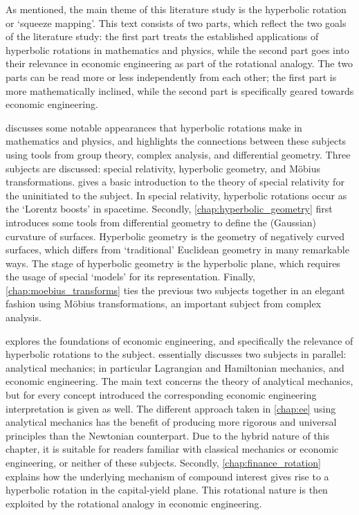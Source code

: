 As mentioned, the main theme of this literature study is the hyperbolic rotation or `squeeze mapping'. This text consists of two parts, which reflect the two goals of the literature study: the first part treats the established applications of hyperbolic rotations in mathematics and physics, while the second part goes into their relevance in economic engineering as part of the rotational analogy. 
The two parts can be read more or less independently from each other; the first part is more mathematically inclined, while the second part is specifically geared towards economic engineering.
\begin{description}
    \item{\textbf{}} discusses some notable appearances that hyperbolic rotations make in mathematics and physics, and highlights the connections between these subjects using tools from group theory, complex analysis, and differential geometry. Three subjects are discussed: special relativity, hyperbolic geometry, and Möbius transformations.  gives a basic introduction to the theory of special relativity for the uninitiated to the subject. In special relativity, hyperbolic rotations occur as the `Lorentz boosts' in spacetime. Secondly, \cref{chap:hyperbolic_geometry} first introduces some tools from differential geometry to define the (Gaussian) curvature of surfaces. Hyperbolic geometry is the geometry of negatively curved surfaces, which differs from `traditional' Euclidean geometry in many remarkable ways. The stage of hyperbolic geometry is the hyperbolic plane, which requires the usage of special `models' for its representation. Finally, \cref{chap:moebius_transforms} ties the previous two subjects together in an elegant fashion using Möbius transformations, an important subject from complex analysis.
    
    \item{\textbf{}} explores the foundations of economic engineering, and specifically the relevance of hyperbolic rotations to the subject.  essentially discusses two subjects in parallel: analytical mechanics; in particular Lagrangian and Hamiltonian mechanics, and economic engineering. The main text concerns the theory of analytical mechanics, but for every concept introduced the corresponding economic engineering interpretation is given as well. The different approach taken in \cref{chap:ee} using analytical mechanics has the benefit of producing more rigorous and universal principles than the Newtonian counterpart. Due to the hybrid nature of this chapter, it is suitable for readers familiar with classical mechanics or economic engineering, or neither of these subjects. Secondly, \cref{chap:finance_rotation} explains how the underlying mechanism of compound interest gives rise to a hyperbolic rotation in the capital-yield plane. This rotational nature is then exploited by the rotational analogy in economic engineering.
\end{description}

